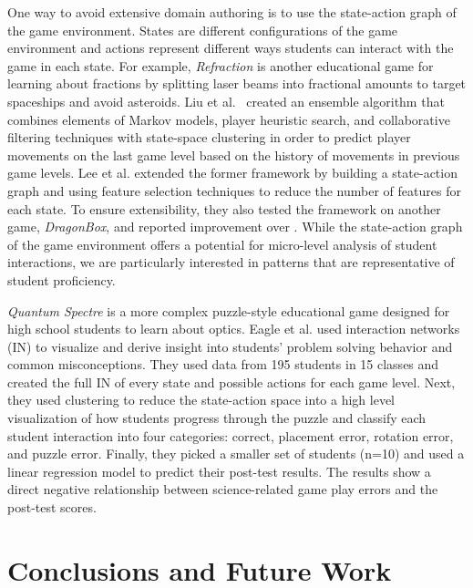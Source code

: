\documentclass{sigchi}
\begin{document}
	One way to avoid extensive domain authoring is to use the state-action graph of the game environment. 
	States are different configurations of the game environment and actions represent different ways students can interact with the game in each state. For example, \textit {Refraction} \cite{andersen2010gameplay} is another educational game for learning about fractions by splitting laser beams into fractional amounts to target spaceships and avoid asteroids. 
	Liu et al.~\cite{liu2013predicting} created an ensemble algorithm that combines elements of Markov models, player heuristic search, and collaborative filtering techniques with state-space clustering in order to predict player movements on the last game level based on the history of movements in previous game levels. 
	Lee et al. \cite{lee2014learning} extended the former framework by building a state-action graph and using feature selection techniques to reduce the number of features for each state. 
	To ensure extensibility, they also tested the framework on another game, \textit {DragonBox}, and reported improvement over \cite{liu2013predicting}.
	While the state-action graph of the game environment offers a potential for micro-level analysis of student interactions, we are particularly interested in patterns that are representative of student proficiency.
	
	\textit {Quantum Spectre} is a more complex puzzle-style educational game designed for high school students to learn about optics. 
	Eagle et al. \cite{eagle2015measuring} used interaction networks (IN) to visualize and derive insight into students' problem solving behavior and common misconceptions. 
	They used data from 195 students in 15 classes and created the full IN of every state and possible actions for each game level. 
	Next, they used clustering to reduce the state-action space into a high level visualization of how students progress through the puzzle and classify each student interaction into four categories: correct, placement error, rotation error, and puzzle error. 
	Finally, they picked a smaller set of students (n=10) and used a linear regression model to predict their post-test results.
	The results show a direct negative relationship between science-related game play errors and the post-test scores.
	
	\section{Conclusions and Future Work}
	\label{sec:conclusion} 
	
\end{document}

